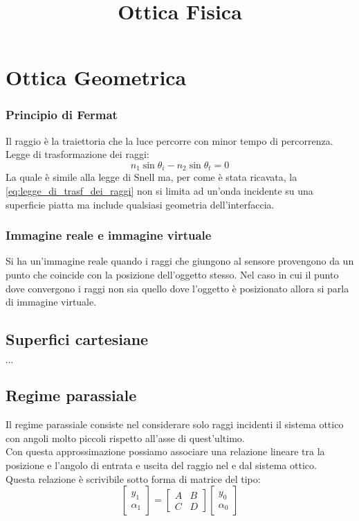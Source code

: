 \documentclass{article}
\title{Ottica Fisica}
\author{}
\date{}
\begin{document}
\maketitle




\section*{Ottica Geometrica}
\subsubsection*{Principio di Fermat}
Il raggio è la traiettoria che la luce percorre con minor tempo di percorrenza.\\
Legge di trasformazione dei raggi:
\begin{equation}	\label{eq:legge_di_trasf_dei_raggi}
n_1 \sin\theta_i - n_2 \sin\theta_t = 0
\end{equation}
La quale è simile alla legge di Snell ma, per come è stata ricavata, la \eqref{eq:legge_di_trasf_dei_raggi} non si limita ad un'onda incidente su una superficie piatta ma include qualsiasi geometria dell'interfaccia.

\subsubsection*{Immagine reale e immagine virtuale}
Si ha un'immagine reale quando i raggi che giungono al sensore provengono da un punto che coincide con la posizione dell'oggetto stesso. Nel caso in cui il punto dove convergono i raggi non sia quello dove l'oggetto è posizionato allora si parla di immagine virtuale.

\subsection*{Superfici cartesiane}
$\cdots$

\subsection*{Regime parassiale}
Il regime parassiale consiste nel considerare solo raggi incidenti il sistema ottico con angoli molto piccoli rispetto all'asse di quest'ultimo.\\
Con questa approssimazione possiamo associare una relazione lineare tra la posizione e l'angolo di entrata e uscita del raggio nel e dal sistema ottico.\\
Questa relazione è scrivibile sotto forma di matrice del tipo:
\[
\begin{bmatrix}
y_1\\
\alpha_1
\end{bmatrix}
=
\begin{bmatrix}
A	&	B\\
C	&	D
\end{bmatrix}
\begin{bmatrix}
y_0\\
\alpha_0
\end{bmatrix}
\]
\end{document}
